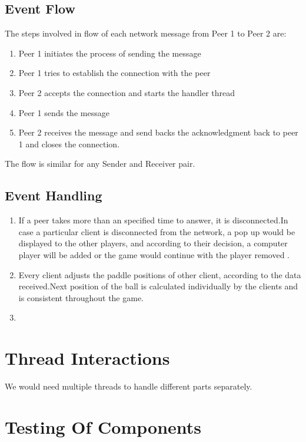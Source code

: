 \documentclass{article}
\begin{document}
			\subsection{Event Flow}
			The steps involved in flow of each network message from Peer 1 to Peer 2 are:
			\begin{enumerate}
			\item Peer 1 initiates the process of sending the message
			\item Peer 1 tries to establish the connection with the peer
			\item Peer 2 accepts the connection and starts the handler thread
			\item Peer 1 sends the message
			\item Peer 2 receives the message and send backs the acknowledgment back to peer 1 and closes the connection.   
			\end{enumerate}
			The flow is similar for any Sender and Receiver pair.
			\subsection{Event Handling}
				\begin{enumerate}
					\item If a peer takes more than an specified time to answer, it is disconnected.In case a particular client is disconnected from the network, a pop up would be displayed to the other players, and according to their decision, a computer player will be added or the game would continue with the player removed .
					\item Every client adjusts the paddle positions of other client, according to the data received.Next position of the ball is calculated individually by the clients and is consistent throughout the game.
					\item  
				\end{enumerate}
			

	\section{Thread Interactions}
	\par\noindent We would need multiple threads to handle different parts separately.
	
	\section{Testing Of Components}
\end{document}

